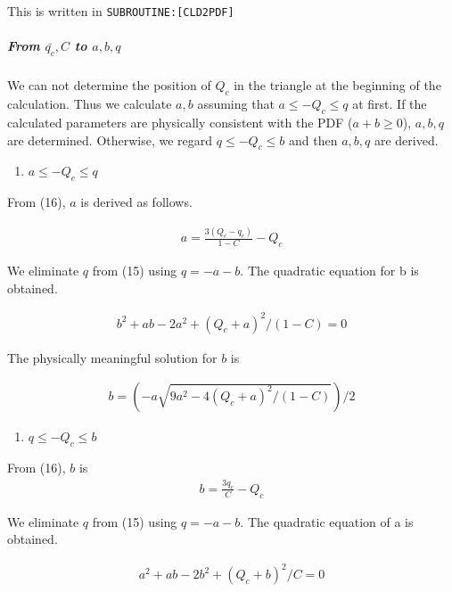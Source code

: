 This is written in \texttt{SUBROUTINE:{[}CLD2PDF{]}}

\hypertarget{from-barq_c-c-to-abq}{%
\subparagraph{\texorpdfstring{From \(\bar{q_c}, C\) to \(a,b,q\)}{From \textbackslash bar\{q\_c\}, C to a,b,q}}\label{from-barq_c-c-to-abq}}

We can not determine the position of \(Q_c\) in the triangle at the beginning of the calculation. Thus we calculate \(a,b\) assuming that \(a \leq-Q_{c} \leq q\) at first. If the calculated parameters
are physically consistent with the PDF (\(a+b \ge 0\)), \(a,b,q\) are determined. Otherwise, we regard \(q \leq-Q_{c} \leq b\) and then \(a,b,q\) are derived.

\begin{enumerate}
\def\labelenumi{\arabic{enumi}.}
\tightlist
\item
  \(a \leq-Q_{c} \leq q\)
\end{enumerate}

From (16), \(a\) is derived as follows.

\begin{eqnarray}
a =\frac{3\left(Q_{c}-q_{c}\right)}{1-C}-Q_{c}
\end{eqnarray}

We eliminate \(q\) from (15) using \(q = -a-b\). The quadratic equation for b is obtained.

\begin{eqnarray}
b^{2}+ab-2a^{2}+\left(Q_{c}+a\right)^{2} /(1-C)=0
\label{E08-17}
\end{eqnarray}

The physically meaningful solution for \(b\) is

\begin{eqnarray}
b=\left(-a\sqrt{9 a^{2}-4\left(Q_{c}+a\right)^{2} /(1-C)}\right) / 2
\label{E08-18}
\end{eqnarray}

\begin{enumerate}
\def\labelenumi{\arabic{enumi}.}
\setcounter{enumi}{1}
\tightlist
\item
  \(q \leq-Q_{c} \leq b\)
\end{enumerate}

From (16), \(b\) is \begin{eqnarray}
b=\frac{3 q_{c}}{C}-Q_{c}
\end{eqnarray}

We eliminate \(q\) from (15) using \(q = -a-b\). The quadratic equation of a is obtained.

\begin{eqnarray}
a^{2}+ab-2 b^{2}+\left(Q_{c}+b\right)^{2} / C=0
\label{E08-17}
\end{eqnarray}

